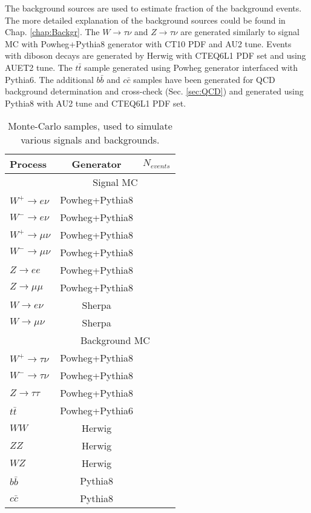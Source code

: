 The background sources are used to estimate fraction of the background events. The more detailed explanation of the background sources could be found in Chap. \ref{chap:Backgr}. The $W\to \tau\nu$ and $Z \to \tau\nu$ are generated similarly to signal MC with Powheg+Pythia8 generator with CT10 PDF and AU2 tune. Events with diboson decays are generated by Herwig with CTEQ6L1\cite{Pumplin2002} PDF set and using AUET2\cite{ATL-PHYS-PUB-2010-014} tune. The $t\bar{t}$ sample generated using Powheg generator interfaced with Pythia6. The additional $b\bar{b}$ and $c\bar{c}$ samples have been generated for QCD background determination and cross-check (Sec. \ref{sec:QCD}) and generated using Pythia8 with AU2 tune and CTEQ6L1 PDF set.



\begin{table}[!tb]
\caption{Monte-Carlo samples, used to simulate various signals and backgrounds.}
\label{tab:MCSamples}
\begin{center}
\begin{tabular}{l | c | c  }
Process & Generator & $N_{events}$ \\
\hline
& \multicolumn{2}{c}{Signal MC}\\
\hline
$W^{+} \to e\nu$ & Powheg+Pythia8 &  \\
$W^{-} \to e\nu$ & Powheg+Pythia8 & \\
$W^{+} \to \mu\nu$ & Powheg+Pythia8 &\\
$W^{-} \to \mu\nu$ & Powheg+Pythia8 &  \\
$Z \to ee$ & Powheg+Pythia8 &  \\
$Z \to \mu\mu$ & Powheg+Pythia8 &  \\
$W \to e\nu$ & Sherpa & \\
$W \to \mu\nu$ & Sherpa & \\
\hline 
\hline
& \multicolumn{2}{c}{Background MC} \\
\hline
$W^{+} \to \tau\nu$ & Powheg+Pythia8 &\\
$W^{-} \to \tau\nu$ & Powheg+Pythia8 & \\
$Z \to \tau\tau$ & Powheg+Pythia8 &  \\
$t \bar{t}$ & Powheg+Pythia6 &  \\
$WW$ & Herwig &   \\
$ZZ$ & Herwig &   \\
$WZ$ & Herwig &   \\
$b\bar{b}$ & Pythia8 & \\
$c\bar{c}$ & Pythia8 & \\
\hline
\end{tabular}
\end{center}
\end{table}